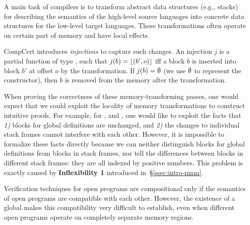 A main task of compilers is to transform abstract data structures
(e.g., stacks) for describing the semantics of the high-level source
languages into concrete data structures for the low-level target
languages. These transformations often operate on certain part of
memory and have local effects.

CompCert introduces \emph{injections} to capture such changes. An
injection $j$ is a partial function of type
, such that $j(b) =
\lfloor (b',o) \rfloor$ iff a block $b$ is inserted into block $b'$ at offset
$o$ by the transformation. If $j(b) = \emptyset$ (we use $\emptyset$ to
represent the  constructor), then $b$ is removed from the
memory after the transformation.

When proving the correctness of these memory-transforming passes, one
would expect that we could exploit the locality of memory
transformations to construct intuitive proofs. For example, for
,  and , one would
like to exploit the facts that \emph{1)} blocks for global definitions
are unchanged, and \emph{2)} the changes to individual stack frames
cannot interfere with each other. However, it is impossible to
formalize these facts directly because we can neither distinguish
blocks for global definitions from blocks in stack frames, nor tell
the differences between blocks in different stack frames: they are all
indexed by positive numbers. This problem is exactly caused by
\textbf{Inflexibility 1} introduced in~\S\ref{ssec:intro-nmm}.


Verification techniques for open programs are compositional only if
the semantics of open programs are compatible with each other.
However, the existence of a global \nextblock makes this compatibility
very difficult to establish, even when different open programs operate
on completely separate memory regions.

